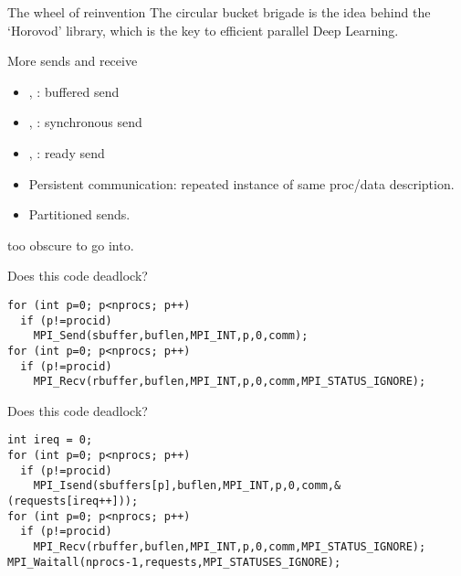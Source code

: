 \begin{numberedframe}{The wheel of reinvention}
  The circular bucket brigade is the idea behind the `Horovod'
  library, which is the key to efficient parallel Deep Learning.
\end{numberedframe}

\begin{numberedframe}{More sends and receive}
  \begin{itemize}
  \item {}, : buffered send
  \item {}, : synchronous send
  \item {}, : ready send
  \item Persistent communication: repeated instance of same proc/data description.
  \end{itemize}
    \begin{mpifour}
      \begin{itemize}
      \item
        Partitioned sends.
      \end{itemize}
    \end{mpifour}
  too obscure to go into.
\end{numberedframe}

\begin{reviewframe}
  Does this code deadlock?
\begin{lstlisting}
for (int p=0; p<nprocs; p++)
  if (p!=procid)
    MPI_Send(sbuffer,buflen,MPI_INT,p,0,comm);
for (int p=0; p<nprocs; p++)
  if (p!=procid)
    MPI_Recv(rbuffer,buflen,MPI_INT,p,0,comm,MPI_STATUS_IGNORE);
\end{lstlisting}
\end{reviewframe}

\begin{reviewframe}
  Does this code deadlock?
\begin{lstlisting}
int ireq = 0;
for (int p=0; p<nprocs; p++)
  if (p!=procid)
    MPI_Isend(sbuffers[p],buflen,MPI_INT,p,0,comm,&(requests[ireq++]));
for (int p=0; p<nprocs; p++)
  if (p!=procid)
    MPI_Recv(rbuffer,buflen,MPI_INT,p,0,comm,MPI_STATUS_IGNORE);
MPI_Waitall(nprocs-1,requests,MPI_STATUSES_IGNORE);
\end{lstlisting}
\end{reviewframe}

